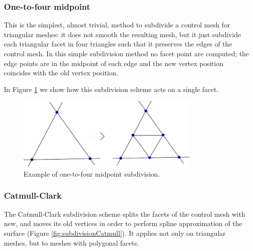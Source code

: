 \subsubsection{One-to-four midpoint}

This is the simplest, almost trivial, method to subdivide a control mesh for triangular meshes: it does not smooth the resulting mesh, but it just subdivide each triangular facet in four triangles such that it preserves the edges of the control mesh.
In this simple subdivision method no facet point are computed; the edge points are in the midpoint of each edge and the new vertex position coincides with the old vertex position.


In Figure \ref{fig:subdivisionMid} we show how this subdivision scheme acts on a single facet.



\begin{figure}[tp]
\begin{center}
  \includegraphics[width=0.8\textwidth]{./img/subdivisionMid}
 \caption{Example of one-to-four midpoint subdivision.}
 \label{fig:subdivisionMid}
\end{center}
\end{figure}

\subsubsection{Catmull-Clark}
The Catmull-Clark subdivision scheme splits the facets of the control mesh with new, and moves its old vertices in order to perform spline approximation of the surface (Figure \ref{fig:subdivisionCatmull}). It applies not only on triangular meshes, but to meshes with polygonal facets.


